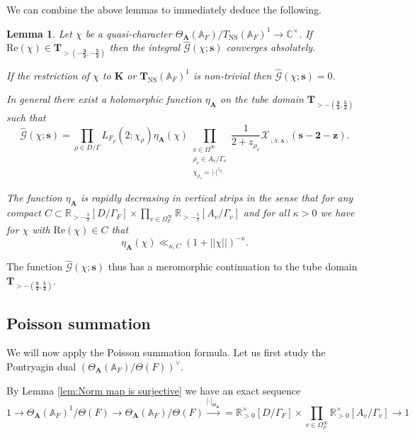 \documentclass[a4paper,11pt,reqno]{amsart}
\newcommand{\R}{\mathbb{R}}
\newcommand{\C}{\mathbb{C}}
\newcommand{\A}{\mathbb{A}}
\DeclareMathOperator{\NS}{NS}
\DeclareMathOperator{\Eff}{\overline{Eff}}
\renewcommand{\Re}{\mathrm{Re}}
\newtheorem{lemma}[theorem]{Lemma}
\theoremstyle{definition}
\begin{document}
We can combine the above lemmas to immediately deduce the following.
\begin{lemma}\label{lem:Global Fourier transform}
	Let $\chi$ be a quasi-character $\Theta_{\mathbf{A}}(\A_F)/T_{\NS}(\A_F)^1 \to \C^{\times}$. If $\Re(\chi) \in \mathbf{T}_{> (\mathbf{-\frac{3}{2}}, \mathbf{-\frac{5}{2}})}$ then the integral $\hat{\mathcal{G}}(\chi ; \mathbf{s})$ converges absolutely.
	
	If the restriction of $\chi$ to $\mathbf{K}$ or $\mathbf{T}_{\NS}(\A_F)^1$ is non-trivial then $\hat{\mathcal{G}}(\chi ; \mathbf{s}) = 0$.
	
	In general there exist a holomorphic function $\eta_{\mathbf{A}}$ on the tube domain $\mathbf{T}_{> - (\mathbf{\frac{3}{2}}, \mathbf{\frac{5}{2}})}$ such that
	\begin{equation*}
		\hat{\mathcal{G}}(\chi ; \mathbf{s}) = \prod_{\rho \in D / \Gamma} L_{F_\rho}(2; \chi_{\rho}) \eta_{\mathbf{A}}(\chi) \prod_{\substack{v \in \Omega^{\infty} \\ \rho_v \in A_v / \Gamma_v \\ \chi_{\rho_v} = |\cdot|^{z_{\rho_v}}}} \frac{1}{2 + z_{\rho_v}} \mathcal{X}_{\Eff_{(X; \mathbf{A})}}(\mathbf{s} - \mathbf{2} - \bm{z}).
	\end{equation*}
	
	The function $\eta_{\mathbf{A}}$ is rapidly decreasing in vertical strips in the sense that for any compact $C \subset \R_{> -\frac{3}{2}}[D / \Gamma_F] \times \prod_{v \in \Omega_{F}^{\infty}} \R_{> -\frac{5}{2}}[A_v / \Gamma_v]$ and for all $\kappa > 0$ we have for $\chi$ with $\Re(\chi) \in C$ that
	\begin{equation}\label{eq:Rapid decay of eta}
		\eta_{\mathbf{A}}(\chi) \ll_{\kappa, C} (1 + ||\chi||)^{- \kappa}.
	\end{equation}
\end{lemma}

The function $\hat{\mathcal{G}}(\chi ; \mathbf{s})$ thus has a meromorphic continuation to the tube domain $\mathbf{T}_{> - (\mathbf{\frac{3}{2}}, \mathbf{\frac{5}{2}})}$.
\subsection{Poisson summation}\label{sec:Poisson summation}
We will now apply the Poisson summation formula. Let us first study the Pontryagin dual $(\Theta_{\mathbf{A}}(\A_F)/\Theta(F))^{\vee}$.

By Lemma \ref{lem:Norm map is surjective} we have an exact sequence
\begin{equation}\label{eq:Exact sequence of Theta(A)/Theta(F)}
 	1 \to \Theta_{\mathbf{A}}(\A_F)^1 /\Theta(F) \to \Theta_{\mathbf{A}}(\A_F)/\Theta(F) \xrightarrow{|\cdot|_{\Theta_{\mathbf{A}}}} = \R_{> 0}^{\times}[D/ \Gamma_F] \times \prod_{v \in \Omega_{F}^{\infty}} \R_{> 0}^{\times}[A_v /\Gamma_v] \to 1
\end{equation}
\end{document}
